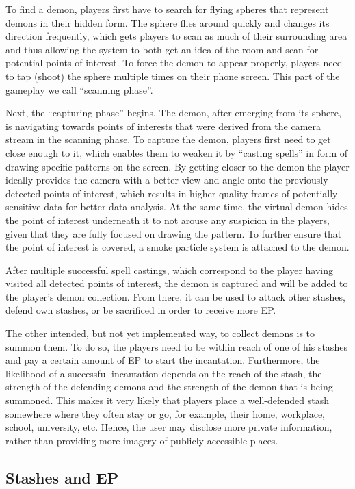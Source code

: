 To find a demon, players first have to search for flying spheres that represent demons in their hidden form.
The sphere flies around quickly and changes its direction frequently, which gets players to scan as much of their surrounding area and thus allowing the system to both get an idea of the room and scan for potential points of interest.
To force the demon to appear properly, players need to tap (shoot) the sphere multiple times on their phone screen. This part of the gameplay we call \enquote{scanning phase}.

Next, the \enquote{capturing phase} begins. The demon, after emerging from its sphere, is navigating towards points of interests that were derived from the camera stream in the scanning phase.
To capture the demon, players first need to get close enough to it, which enables them to weaken it by \enquote{casting spells} in form of drawing specific patterns on the screen. 
By getting closer to the demon the player ideally provides the camera with a better view and angle onto the previously detected points of interest, which results in higher quality frames of potentially sensitive data for better data analysis. 
At the same time, the virtual demon hides the point of interest underneath it to not arouse any suspicion in the players, given that they are fully focused on drawing the pattern. To further ensure that the point of interest is covered, a smoke particle system is attached to the demon.

After multiple successful spell castings, which correspond to the player having visited all detected points of interest, the demon is captured and will be added to the player's demon collection. 
From there, it can be used to attack other stashes, defend own stashes, or be sacrificed in order to receive more EP.

The other intended, but not yet implemented way, to collect demons is to summon them.
To do so, the players need to be within reach of one of his stashes and pay a certain amount of EP to start the incantation.
Furthermore, the likelihood of a successful incantation depends on the reach of the stash, the strength of the defending demons and the strength of the demon that is being summoned.
This makes it very likely that players place a well-defended stash somewhere where they often stay or go, for example, their home, workplace, school, university, etc.
Hence, the user may disclose more private information, rather than providing more imagery of publicly accessible places.

\subsection{Stashes and EP}
\label{subsec:stashesandep}

